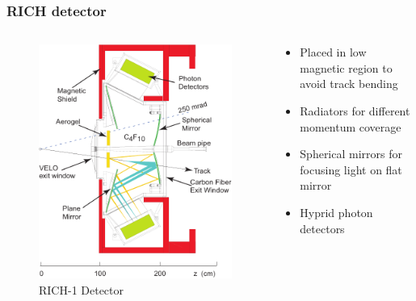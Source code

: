 \documentclass[10pt, xcolor={table}]{beamer}
\begin{document}
\begin{frame}[c]\frametitle{RICH detector}
\begin{columns}
      \begin{column}{0.4\textwidth}
      \begin{figure}
      \centering
         \includegraphics[width=\textwidth]{pics/rich1-2d.pdf}
         \caption{RICH-1 Detector}
      \end{figure}
    \end{column}%
    \begin{column}{0.5\textwidth}
      \begin{itemize}
        \item Placed in low magnetic region to avoid track bending
        \item Radiators for different momentum coverage
        \item Spherical mirrors for focusing light on flat mirror
        \item Hyprid photon detectors
      \end{itemize}
    \end{column}
\end{columns}


\end{frame}
\end{document}
